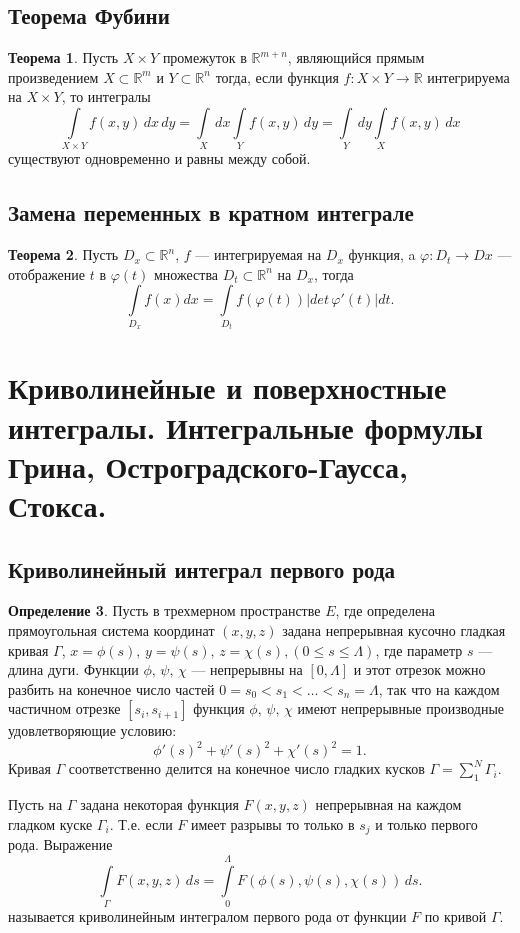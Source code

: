 \documentclass[12pt]{report}
\theoremstyle{definition}
\newtheorem{theorem}{Теорема}[chapter]
\newtheorem{definition}[theorem]{Определение}
\newcommand{\R}{\mathbb R}
\begin{document}
\subsection{Теорема Фубини}
\begin{theorem}
Пусть $X \times Y$ промежуток в $\R^{m + n}$, являющийся прямым произведением
$X \subset \R^m$ и $Y \subset \R^n$ тогда, если функция
$f: X \times Y \rightarrow \R$ интегрируема на $X \times Y$, то интегралы
$$
\int\limits_{X \times Y} f(x, y)\, dx\, dy = 
\int\limits_X\, dx \int\limits_Y f(x, y)\, dy = 
\int\limits_Y\, dy \int\limits_X f(x, y)\, dx
$$
существуют одновременно и равны между собой.
\end{theorem}

\subsection{Замена переменных в кратном интеграле}
\begin{theorem}
Пусть $D_x \subset \R^n$, $f$ --- интегрируемая на $D_x$ функция, 
a $\varphi: D_t \rightarrow Dx$ --- отображение $t$ в $\varphi(t)$
множества $D_t \subset \R^n$ на $D_x$, тогда
$$
\int\limits_{D_x} f(x) dx = \int\limits_{D_t} f(\varphi(t)) |det\, \varphi'(t)| dt.
$$
\end{theorem}


\section
{
Криволинейные и поверхностные интегралы.
Интегральные формулы Грина, Остроградского-Гаусса, Стокса.
}

\subsection{Криволинейный интеграл первого рода}
\begin{definition}
Пусть в трехмерном пространстве $E$, где определена
прямоугольная система координат $(x, y, z)$ задана непрерывная
кусочно гладкая кривая $\Gamma$, $x = \phi(s), \,y = \psi(s), \, z = \chi(s), (0 \le s \le \Lambda)$,
где параметр $s$  --- длина дуги. Функции $\phi,\, \psi,\,\chi$ --- непрерывны на $[0, \Lambda]$ и этот
отрезок можно разбить на конечное число частей $0 = s_0 < s_1 < \dots < s_n = \Lambda$, так что на каждом
частичном отрезке $[s_i, s_{i+1}]$ функция $\phi,\, \psi,\,\chi$ имеют непрерывные производные удовлетворяющие
условию:
$$
\phi'(s)^2 +  \psi'(s)^2 + \chi'(s)^2 = 1.
$$
Кривая $\Gamma$ соответственно делится на конечное число гладких кусков
$\Gamma = \sum\limits_1^N \Gamma_i$.

Пусть на $\Gamma$ задана некоторая функция $F(x, y, z)$ непрерывная на каждом гладком куске $\Gamma_i$.
Т.е. если $F$ имеет разрывы то только в $s_j$ и только первого рода.
Выражение
$$
\int\limits_{\Gamma} F(x, y, z)\, ds = 
\int\limits_{0}^{\Lambda} F(\phi(s), \psi(s), \chi(s))\, ds.
$$
называется криволинейным интегралом первого рода от функции $F$ по кривой $\Gamma$.
\end{definition}
\end{document}
